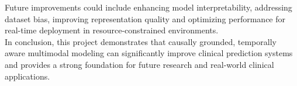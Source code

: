 \documentclass{fisatprojectfinal}
\begin{document}
Future improvements could include enhancing model interpretability, addressing dataset bias, improving representation quality and optimizing performance for real-time deployment in resource-constrained environments. \\ 

In conclusion, this project demonstrates that causally grounded, temporally aware multimodal modeling can significantly improve clinical prediction systems and provides a strong foundation for future research and real-world clinical applications.


\renewcommand\bibname{References}

{\thispagestyle{empty}}

\thispagestyle{empty}
\end{document}
